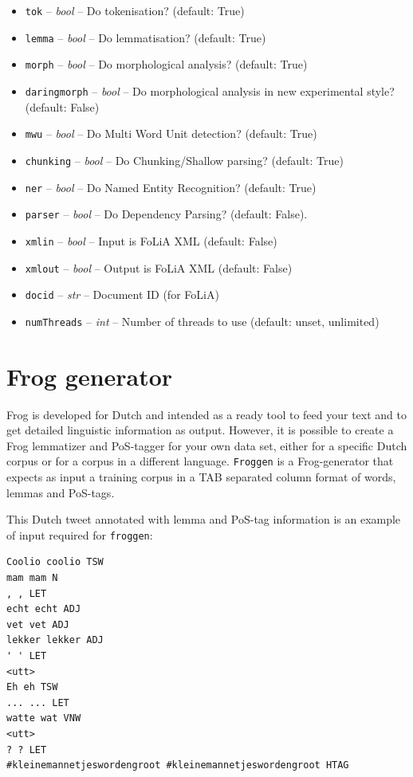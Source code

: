 \documentclass{book}
\begin{document}
\begin{itemize}
	\item \texttt{tok} -- \emph{bool} -- Do tokenisation? (default: True)
	\item \texttt{lemma} -- \emph{bool} -- Do lemmatisation? (default: True)
	\item \texttt{morph} -- \emph{bool} -- Do morphological analysis? (default: True)
	\item \texttt{daringmorph} -- \emph{bool} -- Do morphological analysis in new experimental style? (default: False)
	\item \texttt{mwu} -- \emph{bool} -- Do Multi Word Unit detection? (default: True)
	\item \texttt{chunking} -- \emph{bool} -- Do Chunking/Shallow parsing? (default: True)
	\item \texttt{ner} -- \emph{bool} -- Do Named Entity Recognition? (default: True)
	\item \texttt{parser} -- \emph{bool} -- Do Dependency Parsing? (default: False).
	\item \texttt{xmlin} -- \emph{bool} -- Input is FoLiA XML (default: False)
	\item \texttt{xmlout} -- \emph{bool} -- Output is FoLiA XML (default: False)
	\item \texttt{docid} -- \emph{str} -- Document ID (for FoLiA)
	\item \texttt{numThreads} -- \emph{int} -- Number of threads to use (default: unset, unlimited)
\end{itemize}


\section{Frog generator}

Frog is developed for Dutch and intended as a ready tool to feed your text and to get detailed linguistic information as output.
However, it is possible to create a Frog lemmatizer and PoS-tagger for your own
data set, either for a specific Dutch corpus or for a corpus in a different language. {\tt Froggen} is a Frog-generator that expects as input a training corpus in a TAB separated column format of words, lemmas and PoS-tags.

This Dutch tweet annotated with lemma and PoS-tag information is an example of input required for {\tt froggen}:

\begin{verbatim}
Coolio coolio TSW
mam mam N
, , LET
echt echt ADJ
vet vet ADJ
lekker lekker ADJ
' ' LET
<utt>
Eh eh TSW
... ... LET
watte wat VNW
<utt>
? ? LET
#kleinemannetjeswordengroot #kleinemannetjeswordengroot HTAG
\end{verbatim}
\end{document}
